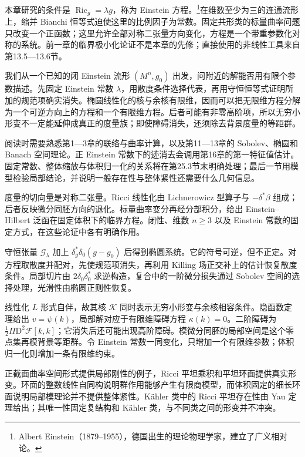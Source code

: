 \ProseParagraphBreak
本章研究的条件是 \(\operatorname{Ric}_g=\lambda g\)，称为 Einstein 方程。\footnote{Albert Einstein（1879--1955），德国出生的理论物理学家，建立了广义相对论。}在维数至少为三的连通流形上，缩并 Bianchi 恒等式迫使这里的比例因子为常数。固定共形类的标量曲率问题只改变一个正函数；这里允许全部对称二张量方向变化，方程是一个带重参数化对称的系统。前一章的临界极小化论证不是本章的先修；直接使用的非线性工具来自第13.5—13.6节。

\ProseParagraphBreak
我们从一个已知的闭 Einstein 流形 \((M^n,g_0)\) 出发，问附近的解能否用有限个参数描述。先固定 Einstein 常数 \(\lambda\)，用散度条件选择代表，再用守恒恒等式证明所加的规范项确实消失。椭圆线性化的核与余核有限维，因而可以把无限维方程分解为一个可逆方向上的方程和一个有限维方程。后者可能有非零高阶项，所以无穷小形变不一定能延伸成真正的度量族；即使障碍消失，还须除去背景度量的等距群。

\ProseParagraphBreak
阅读时需要熟悉第1—3章的联络与曲率计算，以及第11—13章的 Sobolev、椭圆和 Banach 空间理论。正 Einstein 常数下的迹消去会调用第16章的第一特征值估计。固定常数、整体缩放与体积归一化的关系将在第25.3节末明确处理；最后一节用模型检验局部结论，并说明一般存在性与整体紧性还需要什么几何信息。






\begin{chaptersummary}
	度量的切向量是对称二张量。Ricci 线性化由 Lichnerowicz 型算子与 \(-\delta^*\beta\) 组成；后者反映微分同胚方向的退化。标量曲率变分再经分部积分，给出 Einstein--Hilbert 泛函在固定体积下的临界方程。闭性、维数 \(n\ge3\) 以及 Einstein 常数的固定方式，在这些论证中各有明确作用。

	\ProseParagraphBreak
	守恒张量 \(\mathcal G_\lambda\) 加上 \(\delta_g^*\delta_0(g-g_0)\) 后得到椭圆系统。它的符号可逆，但不正定。对方程取散度并配对，先使规范项消失，再利用 Killing 场正交补上的估计恢复散度条件。局部切片由 \(2\delta_0\delta_0^*\) 求逆构造，复合中的一阶微分损失通过 Sobolev 空间的选择处理，光滑性由椭圆正则性恢复。

	\ProseParagraphBreak
	线性化 \(L\) 形式自伴，故其核 \(\mathcal K\) 同时表示无穷小形变与余核相容条件。隐函数定理给出 \(v=\psi(k)\)，局部解对应于有限维障碍方程 \(\kappa(k)=0\)。二阶障碍为 \(\tfrac12\Pi\mathrm D^2\mathcal F[k,k]\)；它消失后还可能出现高阶障碍。模微分同胚的局部空间是这个零点集再模背景等距群。令 Einstein 常数一同变化，只增加一个有限维参数；体积归一化则增加一条有限维约束。

	\ProseParagraphBreak
	正截面曲率空间形式提供局部刚性的例子，Ricci 平坦乘积和平坦环面提供真实形变。环面的整数线性自同构说明群作用能够产生有限商模型，而体积固定的细长环面说明局部模理论并不提供整体紧性。Kähler 类中的 Ricci 平坦存在性由 Yau 定理给出；其唯一性固定复结构和 Kähler 类，与不同类之间的形变并不冲突。
\end{chaptersummary}

